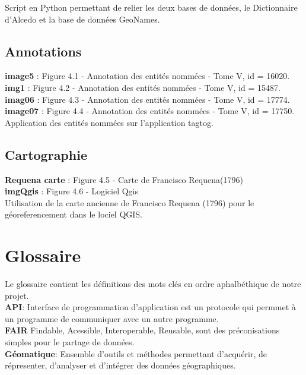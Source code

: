 \documentclass[a4paper,12pt,twoside]{book}
\begin{document}
	Script en Python permettant de relier les deux bases de données, le Dictionnaire d'Alcedo et la base de données GeoNames.
	
	\section{Annotations}
\noindent \textbf{image5} : Figure 4.1 - Annotation des entités nommées - Tome V, id = 16020.\\
	\textbf{img1} : Figure 4.2 - Annotation des entités nommées - Tome V, id = 15487.\\
	\textbf{imag06} : Figure 4.3 - Annotation des entités nommées - Tome V, id = 17774.\\
	\textbf{image07} : Figure 4.4 - Annotation des entités nommées - Tome V, id = 17750.\\
	
	Application des entités nommées sur l'application tagtog.
	
	\section{Cartographie}
\noindent \textbf{Requena carte} : Figure 4.5 - Carte de Francisco Requena(1796)\\
	\textbf{imgQgis} : Figure 4.6 - Logiciel Qgis \\
	
	Utilisation de la carte ancienne  de Francisco Requena (1796) pour le géoreferencement dans le lociel QGIS.
	
	\chapter{Glossaire}
	
	Le glossaire contient les définitions des mots clés en ordre aphalbéthique de notre projet.\\

	
	\noindent \textbf{API}: Interface de programmation d'application est un protocole qui permmet à un programme de communiquer avec un autre programme.\\
	
	\noindent \textbf{FAIR} Findable, Acessible, Interoperable, Reusable, sont des préconisations simples pour le partage de données. \\
	
	\noindent \textbf{Géomatique}: Ensemble d'outils et méthodes permettant d'acquérir, de répresenter, d'analyser et d'intégrer des données géographiques. \\
	
\end{document}
